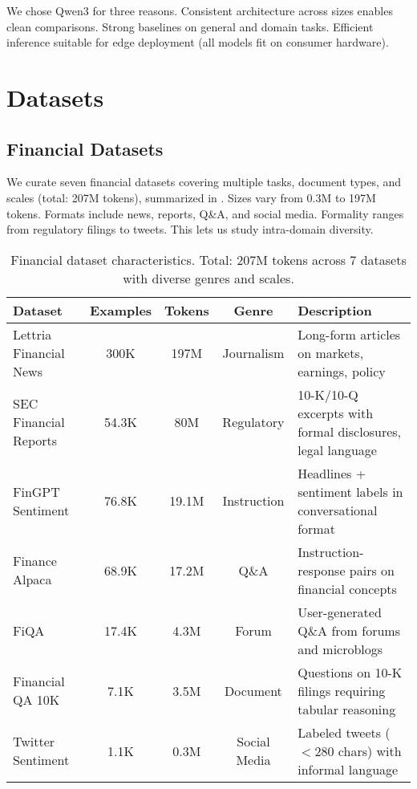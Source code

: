 We chose Qwen3 for three reasons. Consistent architecture across sizes enables clean comparisons. Strong baselines on general and domain tasks. Efficient inference suitable for edge deployment (all models fit on consumer hardware).

\section{Datasets}

\subsection{Financial Datasets}

We curate seven financial datasets covering multiple tasks, document types, and scales (total: 207M tokens), summarized in . Sizes vary from 0.3M to 197M tokens. Formats include news, reports, Q\&A, and social media. Formality ranges from regulatory filings to tweets. This lets us study intra-domain diversity.

\begin{table}[h]
\centering
\caption[Financial Dataset Characteristics]{Financial dataset characteristics. Total: 207M tokens across 7 datasets with diverse genres and scales.}
\label{tab:financial_datasets}
\small
\begin{tabular}{p{3cm}cccp{5.5cm}}
\toprule
\textbf{Dataset} & \textbf{Examples} & \textbf{Tokens} & \textbf{Genre} & \textbf{Description} \\
\midrule
Lettria Financial News & 300K & 197M & Journalism & Long-form articles on markets, earnings, policy \\
\midrule
SEC Financial Reports & 54.3K & 80M & Regulatory & 10-K/10-Q excerpts with formal disclosures, legal language \\
\midrule
FinGPT Sentiment & 76.8K & 19.1M & Instruction & Headlines + sentiment labels in conversational format \\
\midrule
Finance Alpaca & 68.9K & 17.2M & Q\&A & Instruction-response pairs on financial concepts \\
\midrule
FiQA & 17.4K & 4.3M & Forum & User-generated Q\&A from forums and microblogs \\
\midrule
Financial QA 10K & 7.1K & 3.5M & Document & Questions on 10-K filings requiring tabular reasoning \\
\midrule
Twitter Sentiment & 1.1K & 0.3M & Social Media & Labeled tweets ($<$280 chars) with informal language \\
\bottomrule
\end{tabular}
\end{table}

